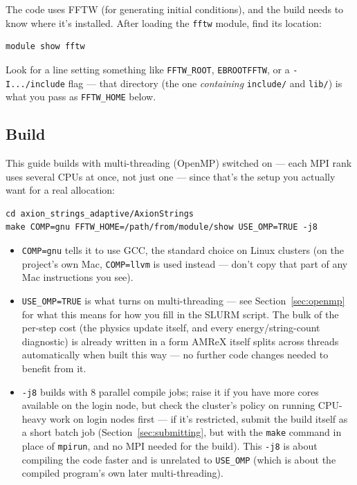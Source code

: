 \documentclass[11pt]{article}
\begin{document}
The code uses FFTW (for generating initial conditions), and the build needs to know where it's installed.
After loading the \texttt{fftw} module, find its location:

\begin{lstlisting}
module show fftw
\end{lstlisting}

Look for a line setting something like \texttt{FFTW\_ROOT}, \texttt{EBROOTFFTW}, or a \texttt{-I.../include}
flag --- that directory (the one \emph{containing} \texttt{include/} and \texttt{lib/}) is what you pass as
\texttt{FFTW\_HOME} below.

\subsection{Build}

This guide builds with multi-threading (OpenMP) switched on --- each MPI rank uses several CPUs at once,
not just one --- since that's the setup you actually want for a real allocation:

\begin{lstlisting}
cd axion_strings_adaptive/AxionStrings
make COMP=gnu FFTW_HOME=/path/from/module/show USE_OMP=TRUE -j8
\end{lstlisting}

\begin{itemize}
  \item \texttt{COMP=gnu} tells it to use GCC, the standard choice on Linux clusters (on the project's own
        Mac, \texttt{COMP=llvm} is used instead --- don't copy that part of any Mac instructions you see).
  \item \texttt{USE\_OMP=TRUE} is what turns on multi-threading --- see Section~\ref{sec:openmp} for what
        this means for how you fill in the SLURM script. The bulk of the per-step cost (the physics update
        itself, and every energy/string-count diagnostic) is already written in a form AMReX itself splits
        across threads automatically when built this way --- no further code changes needed to benefit from
        it.
  \item \texttt{-j8} builds with 8 parallel compile jobs; raise it if you have more cores available on the
        login node, but check the cluster's policy on running CPU-heavy work on login nodes first --- if
        it's restricted, submit the build itself as a short batch job (Section~\ref{sec:submitting}, but
        with the \texttt{make} command in place of \texttt{mpirun}, and no MPI needed for the build). This
        \texttt{-j8} is about compiling the code faster and is unrelated to \texttt{USE\_OMP} (which is
        about the compiled program's own later multi-threading).
\end{itemize}
\end{document}
